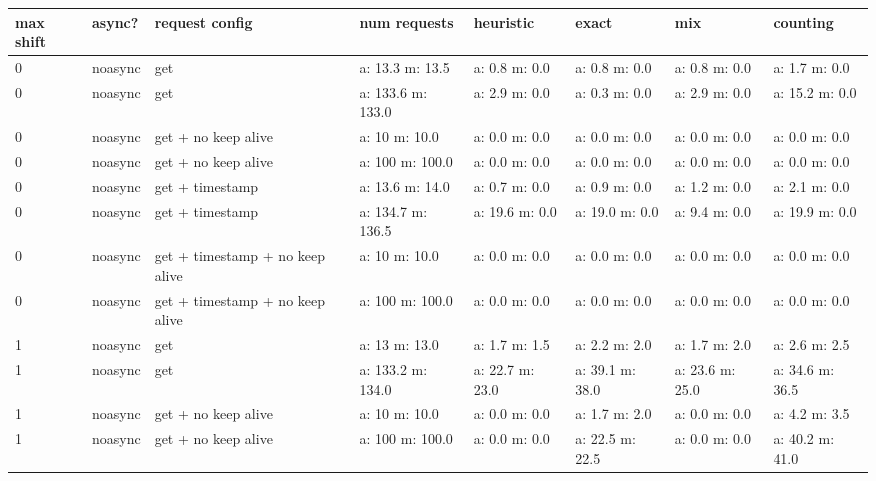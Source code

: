 \documentclass[a4paper]{report}
\begin{document}
\begin{table}[]
	\begin{tabular}{l l l l|l l l l}
		\hline
		max shift & async?  & request config                  & num requests      & heuristic       & exact           & mix             & counting        \\ \hline
		0         & noasync & get                             & a: 13.3 m: 13.5   & a: 0.8 m: 0.0   & a: 0.8 m: 0.0   & a: 0.8 m: 0.0   & a: 1.7 m: 0.0   \\
		0         & noasync & get                             & a: 133.6 m: 133.0 & a: 2.9 m: 0.0   & a: 0.3 m: 0.0   & a: 2.9 m: 0.0   & a: 15.2 m: 0.0  \\
		0         & noasync & get + no keep alive             & a: 10 m: 10.0     & a: 0.0 m: 0.0   & a: 0.0 m: 0.0   & a: 0.0 m: 0.0   & a: 0.0 m: 0.0   \\
		0         & noasync & get + no keep alive             & a: 100 m: 100.0   & a: 0.0 m: 0.0   & a: 0.0 m: 0.0   & a: 0.0 m: 0.0   & a: 0.0 m: 0.0   \\
		0         & noasync & get + timestamp                 & a: 13.6 m: 14.0   & a: 0.7 m: 0.0   & a: 0.9 m: 0.0   & a: 1.2 m: 0.0   & a: 2.1 m: 0.0   \\
		0         & noasync & get + timestamp                 & a: 134.7 m: 136.5 & a: 19.6 m: 0.0  & a: 19.0 m: 0.0  & a: 9.4 m: 0.0   & a: 19.9 m: 0.0  \\
		0         & noasync & get + timestamp + no keep alive & a: 10 m: 10.0     & a: 0.0 m: 0.0   & a: 0.0 m: 0.0   & a: 0.0 m: 0.0   & a: 0.0 m: 0.0   \\
		0         & noasync & get + timestamp + no keep alive & a: 100 m: 100.0   & a: 0.0 m: 0.0   & a: 0.0 m: 0.0   & a: 0.0 m: 0.0   & a: 0.0 m: 0.0   \\
		1         & noasync & get                             & a: 13 m: 13.0     & a: 1.7 m: 1.5   & a: 2.2 m: 2.0   & a: 1.7 m: 2.0   & a: 2.6 m: 2.5   \\
		1         & noasync & get                             & a: 133.2 m: 134.0 & a: 22.7 m: 23.0 & a: 39.1 m: 38.0 & a: 23.6 m: 25.0 & a: 34.6 m: 36.5 \\
		1         & noasync & get + no keep alive             & a: 10 m: 10.0     & a: 0.0 m: 0.0   & a: 1.7 m: 2.0   & a: 0.0 m: 0.0   & a: 4.2 m: 3.5   \\
		1         & noasync & get + no keep alive             & a: 100 m: 100.0   & a: 0.0 m: 0.0   & a: 22.5 m: 22.5 & a: 0.0 m: 0.0   & a: 40.2 m: 41.0 \\

\end{tabular}
\end{table}
\end{document}
